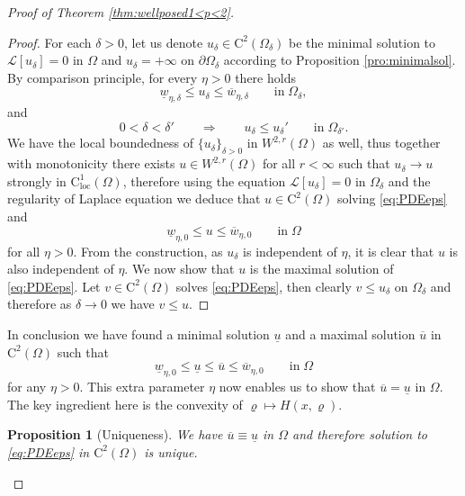 \documentclass[11pt,reqno]{amsart}
\numberwithin{figure}{section}
\theoremstyle{plain}
\newtheorem{prop}[thm]{Proposition}
\theoremstyle{remark}
\numberwithin{equation}{section}
\newcommand{\rmC}{\mathrm{C}}
\begin{document}
\begin{appendices}
\begin{proof} [Proof of Theorem \ref{thm:wellposed1<p<2}]
\begin{proof} For each $\delta>0$, let us denote $u_\delta\in \mathrm{C}^2(\Omega_\delta)$ be the minimal solution to $\mathcal{L}[u_\delta] = 0$ in $\Omega$ and $u_\delta = +\infty$ on $\partial\Omega_\delta$ according to Proposition \ref{pro:minimalsol}. By comparison principle, for every $\eta>0$ there holds
\begin{equation*}
    \underline{w}_{\eta,\delta} \leq u_\delta \leq \overline{w}_{\eta,\delta} \qquad\text{in}\;\Omega_\delta,
\end{equation*}
and
\begin{equation*}
    0<\delta<\delta' \qquad \Longrightarrow\qquad u_\delta \leq u_\delta' \qquad\text{in}\;\Omega_{\delta'}.
\end{equation*}
We have the local boundedness of $\{u_\delta\}_{\delta>0}$ in $W^{2,r}(\Omega)$ as well, thus together with monotonicity there exists $u\in W^{2,r}(\Omega)$ for all $r<\infty$ such that $u_\delta\to u$ strongly in $\rmC^1_{\mathrm{loc}}(\Omega)$, therefore using the equation $\mathcal{L}[u_\delta] = 0$ in $\Omega_\delta$ and the regularity of Laplace equation we deduce that $u\in \mathrm{C}^2(\Omega)$ solving \eqref{eq:PDEeps} and 
\begin{equation*}
    \underline{w}_{\eta,0} \leq u\leq \overline{w}_{\eta,0} \qquad\text{in}\;\Omega
\end{equation*}
for all $\eta>0$. From the construction, as $u_\delta$ is independent of $\eta$, it is clear that $u$ is also independent of $\eta$. We now show that $u$ is the maximal solution of \eqref{eq:PDEeps}. Let $v\in\rmC^2(\Omega)$ solves \eqref{eq:PDEeps}, then clearly $v\leq u_\delta$ on $\Omega_\delta$ and therefore as $\delta \to 0$ we have $v\leq u$.
\end{proof}
\noindent In conclusion we have found a minimal solution $\underline{u}$ and a maximal solution $\overline{u}$ in $\rmC^2(\Omega)$ such that
\begin{equation}\label{e:chain}
    \underline{w}_{\eta,0} \leq \underline{u}\leq \overline{u}\leq \overline{w}_{\eta,0} \qquad\text{in}\;\Omega
\end{equation}
for any $\eta>0$. This extra parameter $\eta$ now enables us to show that $\overline{u} = \underline{u}$ in $\Omega$. The key ingredient here is the convexity of $\varrho\mapsto H(x,\varrho)$.

\begin{prop}[Uniqueness] We have $\overline{u}\equiv \underline{u}$ in $\Omega$ and therefore solution to \eqref{eq:PDEeps} in $\mathrm{C}^2(\Omega)$ is unique.
\end{prop}


\end{proof}
\end{appendices}
\end{document}
